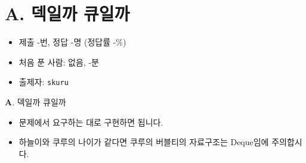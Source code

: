 \section{A. 덱일까 큐일까}

\begin{frame} %
    \begin{itemize}
        \item 제출 -번, 정답 -명 (정답률 -\%)
        \item 처음 푼 사람: 없음, -분
        \item 출제자: \texttt{skuru}
    \end{itemize}
\end{frame}

\begin{frame}{\textbf{A}. 덱일까 큐일까}
    \begin{itemize}
        \item 문제에서 요구하는 대로 구현하면 됩니다.
        \item 하늘이와 쿠루의 나이가 같다면 쿠루의 버블티의 자료구조는 Deque임에 주의합시다.
    \end{itemize}
\end{frame}
